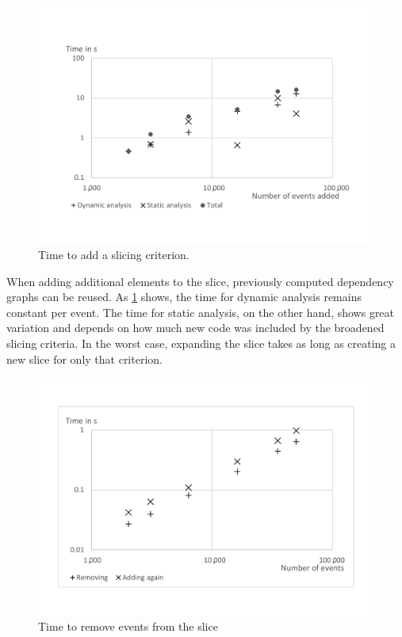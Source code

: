 \documentclass[
			english,
			]{elsarticle}
\begin{document}
\begin{figure}
	\centering
		\includegraphics[width=\linewidth, clip, trim={20mm 26mm 20mm 26mm}]{chart-add.pdf}
	\caption{Time to add a slicing criterion.}
	\label{fig:chartadd}
\end{figure}

When adding additional elements to the slice, previously computed dependency graphs can be reused.
As \cref{fig:chartadd} shows, the time for dynamic analysis remains constant per event.
The time for static analysis, on the other hand, shows great variation and depends on how much new code was included by the broadened slicing criteria.
In the worst case, expanding the slice takes as long as creating a new slice for only that criterion.

\begin{figure}
	\centering
		\includegraphics[width=\linewidth, clip, trim={20mm 26mm 20mm 26mm}]{chart-rem.pdf}
	\caption{Time to remove events from the slice}
	\label{fig:chartrem}
\end{figure}
\end{document}
